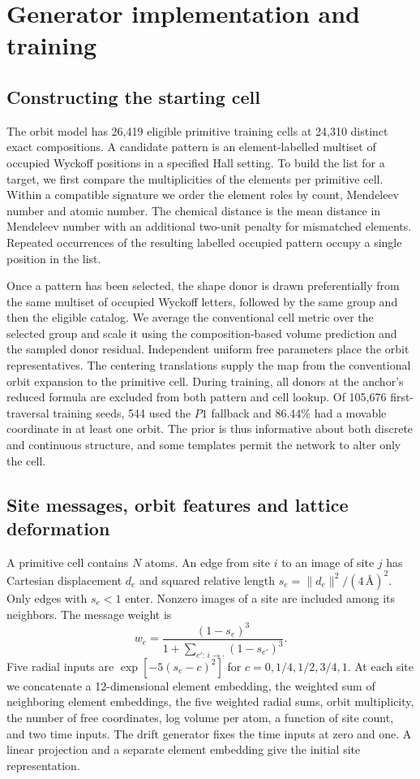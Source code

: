\section{Generator implementation and training}
\label{app:generator-implementation}

\subsection{Constructing the starting cell}

The orbit model has 26,419 eligible primitive training cells at 24,310 distinct exact compositions. A candidate pattern is an element-labelled multiset of occupied Wyckoff positions in a specified Hall setting. To build the list for a target, we first compare the multiplicities of the elements per primitive cell. Within a compatible signature we order the element roles by count, Mendeleev number and atomic number. The chemical distance is the mean distance in Mendeleev number with an additional two-unit penalty for mismatched elements. Repeated occurrences of the resulting labelled occupied pattern occupy a single position in the list.

Once a pattern has been selected, the shape donor is drawn preferentially from the same multiset of occupied Wyckoff letters, followed by the same group and then the eligible catalog. We average the conventional cell metric over the selected group and scale it using the composition-based volume prediction and the sampled donor residual. Independent uniform free parameters place the orbit representatives. The centering translations supply the map from the conventional orbit expansion to the primitive cell. During training, all donors at the anchor's reduced formula are excluded from both pattern and cell lookup. Of 105,676 first-traversal training seeds, 544 used the $P1$ fallback and 86.44\% had a movable coordinate in at least one orbit. The prior is thus informative about both discrete and continuous structure, and some templates permit the network to alter only the cell.

\subsection{Site messages, orbit features and lattice deformation}

A primitive cell contains $N$ atoms. An edge from site $i$ to an image of site $j$ has Cartesian displacement $d_e$ and squared relative length $s_e=\|d_e\|^2/(4\,\text{\AA})^2$. Only edges with $s_e<1$ enter. Nonzero images of a site are included among its neighbors. The message weight is
\[
 w_e=\frac{(1-s_e)^3}{1+\sum_{e':\,i\to\cdot}(1-s_{e'})^3}.
\]
Five radial inputs are $\exp[-5(s_e-c)^2]$ for $c=0,1/4,1/2,3/4,1$. At each site we concatenate a 12-dimensional element embedding, the weighted sum of neighboring element embeddings, the five weighted radial sums, orbit multiplicity, the number of free coordinates, log volume per atom, a function of site count, and two time inputs. The drift generator fixes the time inputs at zero and one. A linear projection and a separate element embedding give the initial site representation.

